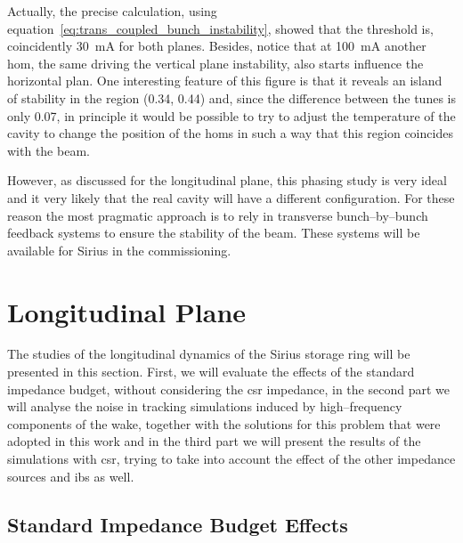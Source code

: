     Actually, the precise calculation, using equation~\eqref{eq:trans_coupled_bunch_instability}, showed that the threshold is, coincidently \SI{30}{\milli\ampere} for both planes. Besides, notice that at \SI{100}{\milli\ampere} another \gls{hom}, the same driving the vertical plane instability, also starts influence the horizontal plan. One interesting feature of this figure is that it reveals an island of stability in the region (0.34, 0.44) and, since the difference between the tunes is only \SI{0.07}{}, in principle it would be possible to try to adjust the temperature of the cavity to change the position of the \glspl{hom} in such a way that this region coincides with the beam.

    However, as discussed for the longitudinal plane, this phasing study is very ideal and it very likely that the real cavity will have a different configuration. For these reason the most pragmatic approach is to rely in transverse bunch--by--bunch feedback systems to ensure the stability of the beam. These systems will be available for Sirius in the commissioning.

\section{Longitudinal Plane}\label{sec:longitudinal_plane}

    The studies of the longitudinal dynamics of the Sirius storage ring will be presented in this section. First, we will evaluate the effects of the standard impedance budget, without considering the \gls{csr} impedance, in the second part we will analyse the noise in tracking simulations induced by high--frequency components of the wake, together with the solutions for this problem that were adopted in this work and in the third part we will present the results of the simulations with \gls{csr}, trying to take into account the effect of the other impedance sources and \gls{ibs} as well.

\subsection{Standard Impedance Budget Effects}\label{ssec:imp_bud_effects}

